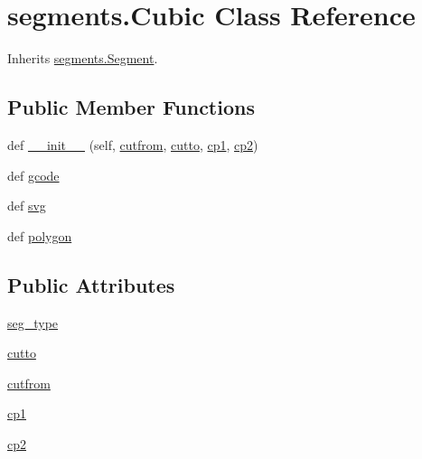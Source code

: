 \hypertarget{classsegments_1_1_cubic}{}\section{segments.\+Cubic Class Reference}
\label{classsegments_1_1_cubic}


Inherits \hyperlink{classsegments_1_1_segment}{segments.\+Segment}.

\subsection*{Public Member Functions}
\begin{DoxyCompactItemize}
\item 
def \hyperlink{classsegments_1_1_cubic_ad74bc1090ec38e60e2fcc07d1d0964e3}{\+\_\+\+\_\+init\+\_\+\+\_\+} (self, \hyperlink{classsegments_1_1_cubic_aba3e470c7944341886bac2f751d7794a}{cutfrom}, \hyperlink{classsegments_1_1_cubic_a2a6bbe67c22dca2202ee9abbee280275}{cutto}, \hyperlink{classsegments_1_1_cubic_abba7183f1a5e759358ec3a9e0f4e5b71}{cp1}, \hyperlink{classsegments_1_1_cubic_ae8e4d11a0e2c1dde141ea4b962da4e58}{cp2})
\item 
def \hyperlink{classsegments_1_1_cubic_a506ce3ee174658e31aaa7017f9a709ba}{gcode}
\item 
def \hyperlink{classsegments_1_1_cubic_a2ee85018d2135912cfcca040b0a79118}{svg}
\item 
def \hyperlink{classsegments_1_1_cubic_a2986509367f3c24a34bd9b8078ca0dcd}{polygon}
\end{DoxyCompactItemize}
\subsection*{Public Attributes}
\begin{DoxyCompactItemize}
\item 
\hyperlink{classsegments_1_1_cubic_a3d87e63eecbf9da1becc55fb858a1f3a}{seg\+\_\+type}
\item 
\hyperlink{classsegments_1_1_cubic_a2a6bbe67c22dca2202ee9abbee280275}{cutto}
\item 
\hyperlink{classsegments_1_1_cubic_aba3e470c7944341886bac2f751d7794a}{cutfrom}
\item 
\hyperlink{classsegments_1_1_cubic_abba7183f1a5e759358ec3a9e0f4e5b71}{cp1}
\item 
\hyperlink{classsegments_1_1_cubic_ae8e4d11a0e2c1dde141ea4b962da4e58}{cp2}
\end{DoxyCompactItemize}
